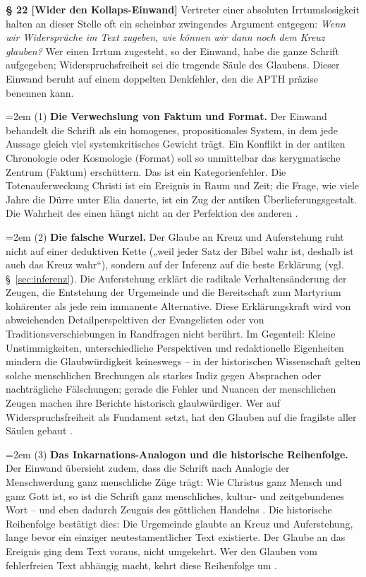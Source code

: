 \documentclass[11pt,a4paper]{article}
\makeatletter
\newcommand{\apth}{{\apthfont APTH}\hspace{0.15em}\xspace}
\newcommand{\subpar}[1]{%
  \begingroup
  \leftskip=2em %
  \noindent#1\par
  \endgroup
}
\newcommand{\apthsec}[3]{%
  \phantomsection%
  \def\@currentlabel{#1}%
  \label{sec:#3}%
  \textbf{§ #1 [#2]}%
}
\makeatother
\begin{document}
\apthsec{22}{Wider den Kollaps-Einwand}{kollaps} Vertreter einer absoluten Irrtumslosigkeit halten an dieser Stelle oft ein scheinbar zwingendes Argument entgegen: \textit{Wenn wir Widersprüche im Text zugeben, wie können wir dann noch dem Kreuz glauben?} Wer einen Irrtum zugesteht, so der Einwand, habe die ganze Schrift aufgegeben; Widerspruchsfreiheit sei die tragende Säule des Glaubens. Dieser Einwand beruht auf einem doppelten Denkfehler, den die \apth präzise benennen kann.

\subpar{(1) \textbf{Die Verwechslung von Faktum und Format.} Der Einwand behandelt die Schrift als ein homogenes, propositionales System, in dem jede Aussage gleich viel systemkritisches Gewicht trägt. Ein Konflikt in der antiken Chronologie oder Kosmologie (Format) soll so unmittelbar das kerygmatische Zentrum (Faktum) erschüttern. Das ist ein Kategorienfehler. Die Totenauferweckung Christi ist ein Ereignis in Raum und Zeit; die Frage, wie viele Jahre die Dürre unter Elia dauerte, ist ein Zug der antiken Überlieferungsgestalt. Die Wahrheit des einen hängt nicht an der Perfektion des anderen \citep{wright2005}.}

\subpar{(2) \textbf{Die falsche Wurzel.} Der Glaube an Kreuz und Auferstehung ruht nicht auf einer deduktiven Kette („weil jeder Satz der Bibel wahr ist, deshalb ist auch das Kreuz wahr“), sondern auf der Inferenz auf die beste Erklärung (vgl. §~\ref{sec:inferenz}). Die Auferstehung erklärt die radikale Verhaltensänderung der Zeugen, die Entstehung der Urgemeinde und die Bereitschaft zum Martyrium kohärenter als jede rein immanente Alternative. Diese Erklärungskraft wird von abweichenden Detailperspektiven der Evangelisten oder von Traditionsverschiebungen in Randfragen nicht berührt. Im Gegenteil: Kleine Unstimmigkeiten, unterschiedliche Perspektiven und redaktionelle Eigenheiten mindern die Glaubwürdigkeit keineswegs – in der historischen Wissenschaft gelten solche menschlichen Brechungen als starkes Indiz gegen Absprachen oder nachträgliche Fälschungen; gerade die Fehler und Nuancen der menschlichen Zeugen machen ihre Berichte historisch glaubwürdiger. Wer auf Widerspruchsfreiheit als Fundament setzt, hat den Glauben auf die fragilste aller Säulen gebaut \citep{bauckham2006}.}

\subpar{(3) \textbf{Das Inkarnations-Analogon und die historische Reihenfolge.} Der Einwand übersieht zudem, dass die Schrift nach Analogie der Menschwerdung ganz menschliche Züge trägt: Wie Christus ganz Mensch und ganz Gott ist, so ist die Schrift ganz menschliches, kultur- und zeitgebundenes Wort – und eben dadurch Zeugnis des göttlichen Handelns \citep{enns2005}. Die historische Reihenfolge bestätigt dies: Die Urgemeinde glaubte an Kreuz und Auferstehung, lange bevor ein einziger neutestamentlicher Text existierte. Der Glaube an das Ereignis ging dem Text voraus, nicht umgekehrt. Wer den Glauben vom fehlerfreien Text abhängig macht, kehrt diese Reihenfolge um \citep{sparks2008}.}
\end{document}
